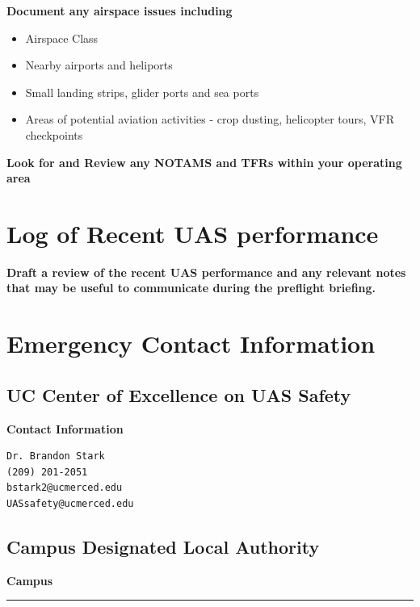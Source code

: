 \documentclass[
]{book}
\providecommand{\tightlist}{%
  \setlength{\itemsep}{0pt}\setlength{\parskip}{0pt}}
\begin{document}
\textbf{Document any airspace issues including}

\begin{itemize}
\tightlist
\item
  Airspace Class
\item
  Nearby airports and heliports
\item
  Small landing strips, glider ports and sea ports
\item
  Areas of potential aviation activities - crop dusting, helicopter tours, VFR checkpoints
\end{itemize}

\textbf{Look for and Review any NOTAMS and TFRs within your operating area}

\hypertarget{ch-performance-log}{%
\chapter{Log of Recent UAS performance}\label{ch-performance-log}}

\textbf{Draft a review of the recent UAS performance and any relevant notes that may be useful to communicate during the preflight briefing.}

\hypertarget{ch-emergency}{%
\chapter{Emergency Contact Information}\label{ch-emergency}}

\hypertarget{uc-center-of-excellence-on-uas-safety}{%
\section{UC Center of Excellence on UAS Safety}\label{uc-center-of-excellence-on-uas-safety}}

\textbf{Contact Information}

\begin{verbatim}
Dr. Brandon Stark
(209) 201-2051
bstark2@ucmerced.edu
UASsafety@ucmerced.edu
\end{verbatim}

\hypertarget{campus-designated-local-authority}{%
\section{Campus Designated Local Authority}\label{campus-designated-local-authority}}

\textbf{Campus}

\begin{center}\rule{0.5\linewidth}{0.5pt}\end{center}
\end{document}
